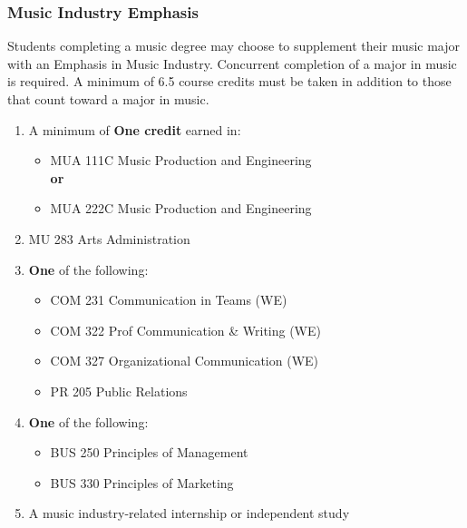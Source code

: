 \documentclass[
  letterpaper,
]{scrbook}
\providecommand{\tightlist}{%
  \setlength{\itemsep}{0pt}\setlength{\parskip}{0pt}}
\begin{document}
\subsubsection{Music Industry Emphasis}\label{music-industry-emphasis}

Students completing a music degree may choose to supplement their music
major with an Emphasis in Music Industry. Concurrent completion of a
major in music is required. A minimum of 6.5 course credits must be
taken in addition to those that count toward a major in music.

\begin{enumerate}
\def\labelenumi{\arabic{enumi}.}
\tightlist
\item
  A minimum of \textbf{One credit} earned in:

  \begin{itemize}
  \tightlist
  \item
    MUA 111C Music Production and Engineering\\
    \textbf{or}\\
  \item
    MUA 222C Music Production and Engineering\\
  \end{itemize}
\item
  MU 283 Arts Administration\\
\item
  \textbf{One} of the following:

  \begin{itemize}
  \tightlist
  \item
    COM 231 Communication in Teams (WE)\\
  \item
    COM 322 Prof Communication \& Writing (WE)\\
  \item
    COM 327 Organizational Communication (WE)\\
  \item
    PR 205 Public Relations\\
  \end{itemize}
\item
  \textbf{One} of the following:

  \begin{itemize}
  \tightlist
  \item
    BUS 250 Principles of Management\\
  \item
    BUS 330 Principles of Marketing\\
  \end{itemize}
\item
  A music industry-related internship or independent study
\end{enumerate}
\end{document}
